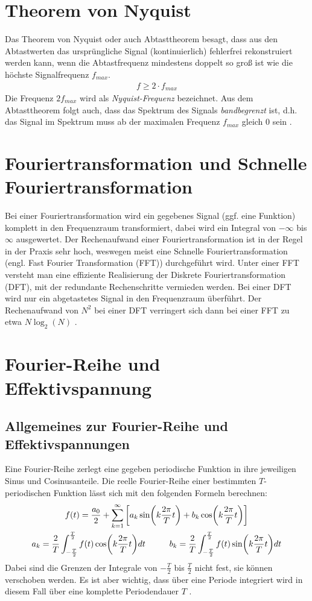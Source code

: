 \section{Theorem von Nyquist}
Das Theorem von Nyquist oder auch Abtasttheorem besagt, dass aus den Abtastwerten das ursprüngliche Signal (kontinuierlich) fehlerfrei rekonstruiert werden kann, wenn die Abtastfrequenz mindestens doppelt so groß ist wie die höchste Signalfrequenz $f_{max}$. 
\begin{gather}
    f \geq 2\cdot f_{max}
\end{gather} 
Die Frequenz $2f_{max}$ wird als \textit{Nyquist-Frequenz} bezeichnet. Aus dem Abtasttheorem folgt auch, dass das Spektrum des Signals \textit{bandbegrenzt} ist, d.h. das Signal im Spektrum muss ab der maximalen Frequenz $f_{max}$ gleich 0 sein \citep{praktikum}.
\section{Fouriertransformation und Schnelle Fouriertransformation}
Bei einer Fouriertransformation wird ein gegebenes Signal (ggf. eine Funktion) komplett in den Frequenzraum transformiert, dabei wird ein Integral von $-\infty$ bis $\infty$ ausgewertet. Der Rechenaufwand einer Fouriertransformation ist in der Regel in der Praxis sehr hoch, weswegen meist eine Schnelle Fouriertransformation (engl. Fast Fourier Transformation (FFT)) durchgeführt wird. Unter einer FFT versteht man eine effiziente Realisierung der Diskrete Fouriertransformation (DFT), mit der redundante Rechenschritte vermieden werden. Bei einer DFT wird nur ein abgetastetes Signal in den Frequenzraum überführt. Der Rechenaufwand von $N^2$ bei einer DFT verringert sich dann  bei einer FFT zu etwa $N\log_2\left(N\right)$ \citep{praktikum}.
\section{Fourier-Reihe und Effektivspannung}
\label{sec:fourierseries}
\subsection*{Allgemeines zur Fourier-Reihe und Effektivspannungen}
\label{sub:fourierseriesAllgemein}
Eine Fourier-Reihe zerlegt eine gegeben periodische Funktion in ihre jeweiligen Sinus und Cosinusanteile. Die reelle Fourier-Reihe einer bestimmten $T$-periodischen Funktion lässt sich mit den folgenden Formeln berechnen:
\begin{gather}
    f(t) = \frac{a_0}{2} + \sum^{\infty}_{k=1} \left[a_k \sin(k\frac{2\pi}{T} t) +b_k \cos(k\frac{2\pi}{T} t)\right]\\
    a_k = \frac{2}{T} \int^{\frac{T}{2}}_{-\frac{T}{2}} f(t)\cos(k \frac{2\pi}{T} t)dt \tab
    b_k = \frac{2}{T} \int^{\frac{T}{2}}_{-\frac{T}{2}} f(t)\sin(k \frac{2\pi}{T} t)dt
\end{gather}
Dabei sind die Grenzen der Integrale von $-\frac{T}{2}$ bis $\frac{T}{2}$ nicht fest, sie können verschoben werden. Es ist aber wichtig, dass über eine Periode integriert wird in diesem Fall über eine komplette Periodendauer $T$ \citep{praktikum}.\\

